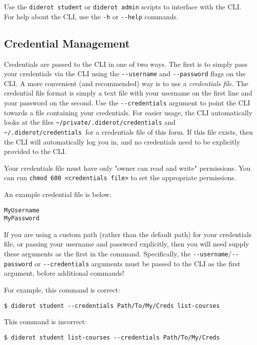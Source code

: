 Use the \verb|diderot student| or \verb|diderot admin| scripts to interface with the CLI.
%
For help about the CLI, use the \verb|-h| or \verb|--help| commands.

\subsection{Credential Management}
Credentials are passed to the CLI in one of two ways. 
%
The first is to simply pass your credentials via the CLI using the \verb|--username| and \verb|--password| flags on the CLI. 
%
A more convenient (and recommended) way is to use a \emph{credentials file}.
%
The credential file format is simply a text file with your username on the first line and your password on the second. 
%
Use the \verb|--credentials| argument to point the CLI towards a file containing your credentials.
%
For easier usage, the CLI automatically looks at the files \verb|~/private/.diderot/credentials| and \verb|~/.diderot/credentials |for a credentials file of this form. 
%
If this file exists, then the CLI will automatically log you in, and no credentials need to be explicitly provided to the CLI.
%

\begin{important}
Your credentials file must have only "owner can read and write" permissions. 
%
You can  run \verb|chmod 600 <credentials file>| to set the appropriate permissions.
\end{important}

\begin{example}
An example credential file is below.
\begin{verbatim}
MyUsername
MyPassword
\end{verbatim}
\end{example}

\begin{important}
If you are using a custom path (rather than the default path) for your credentials file, or passing your username and password explicitly, then you will need supply these arguments as the first in the command.
%
Specifically, the
%
\verb|--username|/\verb|--password| or \verb|--credentials| 
%
arguments must be passed to the CLI as the first argument, before
additional commands!

For example, this command is correct:
\begin{verbatim}
$ diderot student --credentials Path/To/My/Creds list-courses
\end{verbatim}
  
This command is incorrect:
\begin{verbatim}
$ diderot student list-courses --credentials Path/To/My/Creds
\end{verbatim}
\end{important}


